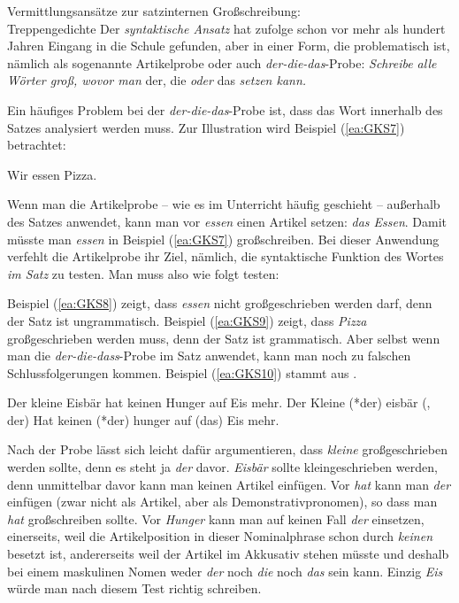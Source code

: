 \begin{Exkurs}{Vermittlungsansätze zur satzinternen Großschreibung:\\ Treppengedichte}
Der \textit{syntaktische Ansatz} hat \citet[9]{GuentherNuenke2005} zufolge schon vor mehr als hundert Jahren Eingang in die Schule gefunden, aber in einer Form, die problematisch ist, nämlich als sogenannte Artikelprobe oder auch \textit{der-die-das}-Probe: \textit{Schreibe alle Wörter groß, wovor man} der, die \textit{oder} das \textit{setzen kann.}

Ein häufiges Problem bei der \textit{der-die-das}-Probe ist, dass das Wort innerhalb des Satzes analysiert werden muss. Zur Illustration wird Beispiel (\ref{ea:GKS7}) betrachtet:

\ea \label{ea:GKS7} Wir essen Pizza.
\z

Wenn man die Artikelprobe -- wie es im Unterricht häufig geschieht -- außerhalb des Satzes anwendet, kann man vor \textit{essen} einen Artikel setzen: \textit{das Essen}. Damit müsste man \textit{essen} in Beispiel (\ref{ea:GKS7}) großschreiben. Bei dieser Anwendung verfehlt die Artikelprobe ihr Ziel, nämlich, die syntaktische Funktion des Wortes \textit{im Satz} zu testen. Man muss also wie folgt testen:

\ea \label{GKSB}
\label{ea:GKS8}
\label{ea:GKS9}
\z
\z

Beispiel (\ref{ea:GKS8}) zeigt, dass \textit{essen} nicht großgeschrieben werden darf, denn der Satz ist ungrammatisch. Beispiel (\ref{ea:GKS9}) zeigt, dass \textit{Pizza} großgeschrieben werden muss, denn der Satz ist grammatisch. Aber selbst wenn man die \textit{der-die-dass}-Probe im Satz anwendet, kann man noch zu falschen Schlussfolgerungen kommen. Beispiel (\ref{ea:GKS10}) stammt aus \citet[16]{GuentherNuenke2005}. 

\ea \label{GKSC}
\ea \label{ea:GKS10} Der kleine Eisbär hat keinen Hunger auf Eis mehr.
\ex \label{ea:GKS11} Der Kleine (*der) eisbär (, der) Hat keinen (*der) hunger auf (das) Eis mehr.
\z
\z

Nach der Probe lässt sich leicht dafür argumentieren, dass \textit{kleine} großgeschrieben werden sollte, denn es steht ja \textit{der} davor. \textit{Eisbär} sollte kleingeschrieben werden, denn unmittelbar davor kann man keinen Artikel einfügen. Vor \textit{hat} kann man \textit{der} einfügen (zwar nicht als Artikel, aber als Demonstrativpronomen), so dass man \textit{hat} großschreiben sollte. Vor \textit{Hunger} kann man auf keinen Fall \textit{der} einsetzen, einerseits, weil die Artikelposition in dieser Nominalphrase schon durch \textit{keinen} besetzt ist, andererseits weil der Artikel im Akkusativ stehen müsste und deshalb bei einem maskulinen Nomen weder \textit{der} noch \textit{die} noch \textit{das} sein kann. Einzig \textit{Eis} würde man nach diesem Test richtig schreiben.



\end{Exkurs}
